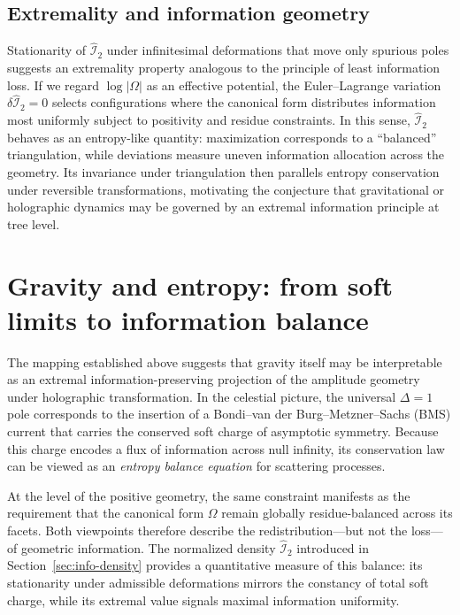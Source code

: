 \documentclass[11pt]{article}
\begin{document}
\subsection{Extremality and information geometry}
Stationarity of $\widehat{\mathcal I}_2$ under infinitesimal deformations that move only spurious poles suggests an extremality property analogous to the principle of least information loss.  
If we regard $\log|\Omega|$ as an effective potential, the Euler–Lagrange variation
\(\delta\widehat{\mathcal I}_2=0\)
selects configurations where the canonical form distributes information most uniformly subject to positivity and residue constraints.  
In this sense, $\widehat{\mathcal I}_2$ behaves as an entropy-like quantity: maximization corresponds to a ``balanced'' triangulation, while deviations measure uneven information allocation across the geometry.  
Its invariance under triangulation then parallels entropy conservation under reversible transformations, motivating the conjecture that gravitational or holographic dynamics may be governed by an extremal information principle at tree level.

\section{Gravity and entropy: from soft limits to information balance}
\label{sec:gravity-entropy}

The mapping established above suggests that gravity itself may be interpretable as an extremal information-preserving projection of the amplitude geometry under holographic transformation.  
In the celestial picture, the universal $\Delta = 1$ pole corresponds to the insertion of a Bondi--van der Burg--Metzner--Sachs (BMS) current that carries the conserved soft charge of asymptotic symmetry.  
Because this charge encodes a flux of information across null infinity, its conservation law can be viewed as an \emph{entropy balance equation} for scattering processes.

\vspace{3pt}
\noindent
At the level of the positive geometry, the same constraint manifests as the requirement that the canonical form $\Omega$ remain globally residue-balanced across its facets.  
Both viewpoints therefore describe the redistribution---but not the loss---of geometric information.  
The normalized density $\widehat{\mathcal I}_2$ introduced in Section~\ref{sec:info-density} provides a quantitative measure of this balance: its stationarity under admissible deformations mirrors the constancy of total soft charge, while its extremal value signals maximal information uniformity.
\end{document}
